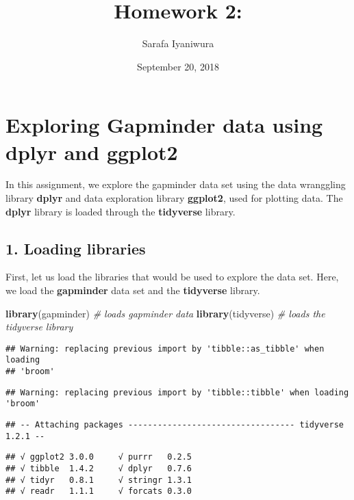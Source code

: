 \documentclass[]{article}
\title{Homework 2:}
\author{Sarafa Iyaniwura}
\date{September 20, 2018}
\newenvironment{Shaded}{\begin{snugshade}}{\end{snugshade}}
\newcommand{\KeywordTok}[1]{\textcolor[rgb]{0.13,0.29,0.53}{\textbf{{#1}}}}
\newcommand{\CommentTok}[1]{\textcolor[rgb]{0.56,0.35,0.01}{\textit{{#1}}}}
\newcommand{\NormalTok}[1]{{#1}}
\begin{document}
\maketitle

{
\setcounter{tocdepth}{2}
\tableofcontents
}
\section{\texorpdfstring{Exploring Gapminder data using \textbf{dplyr}
and
\textbf{ggplot2}}{Exploring Gapminder data using dplyr and ggplot2}}\label{exploring-gapminder-data-using-dplyr-and-ggplot2}

In this assignment, we explore the gapminder data set using the data
wranggling library \textbf{dplyr} and data exploration library
\textbf{ggplot2}, used for plotting data. The \textbf{dplyr} library is
loaded through the \textbf{tidyverse} library.

\subsection{1. Loading libraries}\label{loading-libraries}

First, let us load the libraries that would be used to explore the data
set. Here, we load the \textbf{gapminder} data set and the
\textbf{tidyverse} library.

\begin{Shaded}
\begin{Highlighting}[]
\KeywordTok{library}\NormalTok{(gapminder)  }\CommentTok{# loads gapminder data}
\KeywordTok{library}\NormalTok{(tidyverse)  }\CommentTok{# loads the tidyverse library}
\end{Highlighting}
\end{Shaded}

\begin{verbatim}
## Warning: replacing previous import by 'tibble::as_tibble' when loading
## 'broom'
\end{verbatim}

\begin{verbatim}
## Warning: replacing previous import by 'tibble::tibble' when loading 'broom'
\end{verbatim}

\begin{verbatim}
## -- Attaching packages ---------------------------------- tidyverse 1.2.1 --
\end{verbatim}

\begin{verbatim}
## √ ggplot2 3.0.0     √ purrr   0.2.5
## √ tibble  1.4.2     √ dplyr   0.7.6
## √ tidyr   0.8.1     √ stringr 1.3.1
## √ readr   1.1.1     √ forcats 0.3.0
\end{verbatim}
\end{document}
